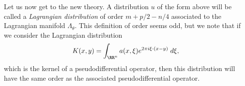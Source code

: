Let us now get to the new theory. A distribution $u$ of the form above will be called a \emph{Lagrangian distribution} of order $m + p/2 - n/4$ associated to the Lagrangian manifold $\Lambda_\theta$. This definition of order seems odd, but we note that if we consider the Lagrangian distribution
%
\[ K(x,y) = \int_{\RR^n} a(x,\xi) e^{2 \pi i \xi \cdot (x - y)}\; d\xi, \]
%
which is the kernel of a pseudodifferential operator, then this distribution will have the same order as the associated pseudodifferential operator.














